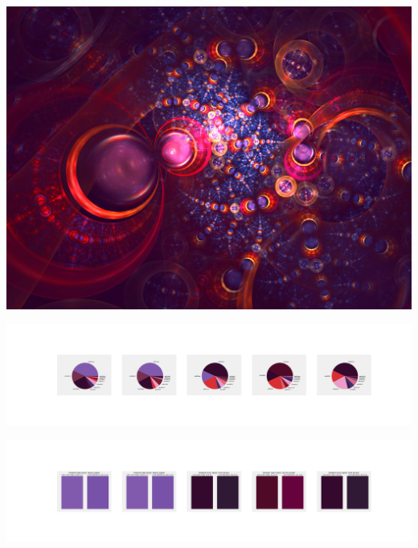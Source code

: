 \documentclass[11pt]{article}
\begin{document}
\begin{landscape}
    \begin{center}
    \includegraphics[width=\textwidth]{./nbimg/file (202).jpg}
    \end{center}

    \begin{center}
    \includegraphics[width=250mm]{./nbimg/pie-115.jpg}
    \end{center}

    \begin{center}
    \includegraphics[width=250mm]{./nbimg/peak-115.jpg}
    \end{center}
    


\end{landscape}
\end{document}

